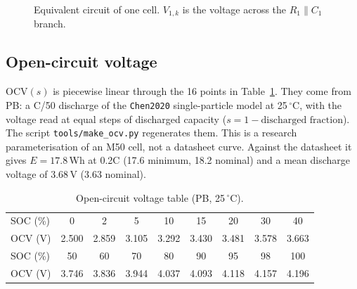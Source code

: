 \documentclass[11pt,a4paper]{article}
\newcommand{\degC}{\ensuremath{{}^{\circ}\mathrm{C}}}
\begin{document}
\begin{figure}[H]
\centering
{}
\caption{Equivalent circuit of one cell. $V_{1,k}$ is the voltage across the $R_1\parallel C_1$ branch.}\label{fig:circuit}
\end{figure}

\subsection{Open-circuit voltage}
$\mathrm{OCV}(s)$ is piecewise linear through the 16 points in Table~\ref{tab:ocv}. They come from PB: a C/50 discharge of the \texttt{Chen2020} single-particle model at 25\,\degC, with the voltage read at equal steps of discharged capacity ($s=1-\text{discharged fraction}$). The script \texttt{tools/make\_ocv.py} regenerates them. This is a research parameterisation of an M50 cell, not a datasheet curve. Against the datasheet it gives $E=17.8$\,Wh at 0.2C (17.6 minimum, 18.2 nominal) and a mean discharge voltage of 3.68\,V (3.63 nominal).

\begin{table}[H]
\centering
\small
\begin{tabular}{@{}l*{8}{c}@{}}
\toprule
SOC (\%) & 0 & 2 & 5 & 10 & 15 & 20 & 30 & 40 \\
OCV (V) & 2.500 & 2.859 & 3.105 & 3.292 & 3.430 & 3.481 & 3.578 & 3.663 \\
\midrule
SOC (\%) & 50 & 60 & 70 & 80 & 90 & 95 & 98 & 100 \\
OCV (V) & 3.746 & 3.836 & 3.944 & 4.037 & 4.093 & 4.118 & 4.157 & 4.196 \\
\bottomrule
\end{tabular}
\caption{Open-circuit voltage table (PB, 25\,\degC).}\label{tab:ocv}
\end{table}
\end{document}
